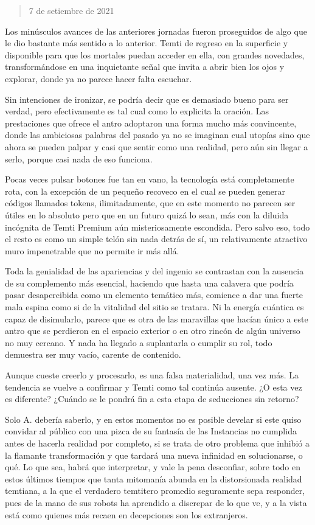 \documentclass[
  spanish,
]{book}
\begin{document}
\begin{quote}
7 de setiembre de 2021
\end{quote}

Los minúsculos avances de las anteriores jornadas fueron proseguidos de algo que le dio bastante más sentido a lo anterior. Temti de regreso en la superficie y disponible para que los mortales puedan acceder en ella, con grandes novedades, transformándose en una inquietante señal que invita a abrir bien los ojos y explorar, donde ya no parece hacer falta escuchar.

Sin intenciones de ironizar, se podría decir que es demasiado bueno para ser verdad, pero efectivamente es tal cual como lo explicita la oración. Las prestaciones que ofrece el antro adoptaron una forma mucho más convincente, donde las ambiciosas palabras del pasado ya no se imaginan cual utopías sino que ahora se pueden palpar y casi que sentir como una realidad, pero aún sin llegar a serlo, porque casi nada de eso funciona.

Pocas veces pulsar botones fue tan en vano, la tecnología está completamente rota, con la excepción de un pequeño recoveco en el cual se pueden generar códigos llamados tokens, ilimitadamente, que en este momento no parecen ser útiles en lo absoluto pero que en un futuro quizá lo sean, más con la diluida incógnita de Temti Premium aún misteriosamente escondida. Pero salvo eso, todo el resto es como un simple telón sin nada detrás de sí, un relativamente atractivo muro impenetrable que no permite ir más allá.

Toda la genialidad de las apariencias y del ingenio se contrastan con la ausencia de su complemento más esencial, haciendo que hasta una calavera que podría pasar desapercibida como un elemento temático más, comience a dar una fuerte mala espina como si de la vitalidad del sitio se tratara. Ni la energía cuántica es capaz de disimularlo, parece que es otra de las maravillas que hacían único a este antro que se perdieron en el espacio exterior o en otro rincón de algún universo no muy cercano. Y nada ha llegado a suplantarla o cumplir su rol, todo demuestra ser muy vacío, carente de contenido.

Aunque cueste creerlo y procesarlo, es una falsa materialidad, una vez más. La tendencia se vuelve a confirmar y Temti como tal continúa ausente. ¿O esta vez es diferente? ¿Cuándo se le pondrá fin a esta etapa de seducciones sin retorno?

Solo A. debería saberlo, y en estos momentos no es posible develar si este quiso convidar al público con una pizca de su fantasía de las Instancias no cumplida antes de hacerla realidad por completo, si se trata de otro problema que inhibió a la flamante transformación y que tardará una nueva infinidad en solucionarse, o qué. Lo que sea, habrá que interpretar, y vale la pena desconfiar, sobre todo en estos últimos tiempos que tanta mitomanía abunda en la distorsionada realidad temtiana, a la que el verdadero temtitero promedio seguramente sepa responder, pues de la mano de sus robots ha aprendido a discrepar de lo que ve, y a la vista está como quienes más recaen en decepciones son los extranjeros.
\end{document}
